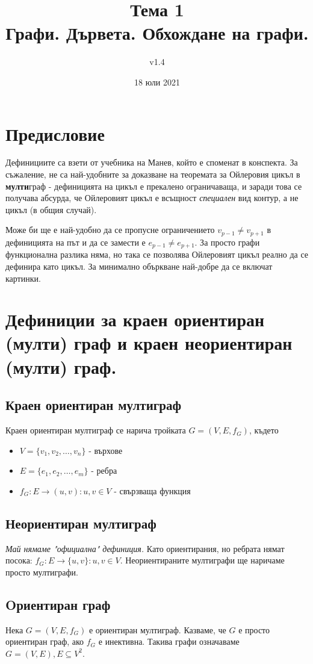 \documentclass[fleqn,12pt]{article}
\title{Тема 1\\ Графи. Дървета. Обхождане на графи.}
\author{v1.4}
\date{18 юли 2021}
\begin{document}
\maketitle

\tableofcontents

\section{Предисловие}
Дефинициите са взети от учебника на Манев, който е споменат в конспекта. За съжаление, не са най-удобните за 
доказване на теоремата за Ойлеровия цикъл в \textbf{мулти}граф - дефиницията на цикъл е прекалено ограничаваща, 
и заради това се получава абсурда, че Ойлеровият цикъл е всъщност \textit{специален} вид контур, а не цикъл (в общия случай). 

Може би ще е най-удобно да се пропусне ограничението $v_{p-1} \neq v_{p+1}$ в дефиницията на път и да се замести е $e_{p-1} \neq e_{p+1}$.
За просто графи функционална разлика няма, но така се позволява Ойлеровият цикъл реално да се дефинира като цикъл. За минимално объркване най-добре да 
се включат картинки.

\section{Дефиниции за краен ориентиран (мулти) граф и краен неориентиран (мулти) граф.}
\subsection{Краен ориентиран мултиграф}
Краен ориентиран мултиграф се нарича тройката $G = (V, E, f_G)$, където
\begin{itemize}
	\item $V = \{ v_1, v_2, \dots, v_n \}$ - върхове
	\item $E = \{ e_1, e_2, \dots, e_m \}$ - ребра
	\item $f_G : E \rightarrow (u,v) : u,v \in V$ - свързваща функция
\end{itemize}

\subsection{Неориентиран мултиграф}
\textit{Май нямаме "официална" дефиниция. } Като ориентирания, но ребрата нямат посока: $f_G : E \rightarrow \{u,v\} : u,v \in V$.
Неориентираните мултиграфи ще наричаме просто мултиграфи.

\subsection{Oриентиран граф}
Нека $G = (V, E, f_G)$ е ориентиран мултиграф. Казваме, че $G$ е просто ориентиран граф, ако $f_G$ е инективна. 
Такива графи означаваме $G = (V, E), E \subseteq V^2$.
\end{document}
